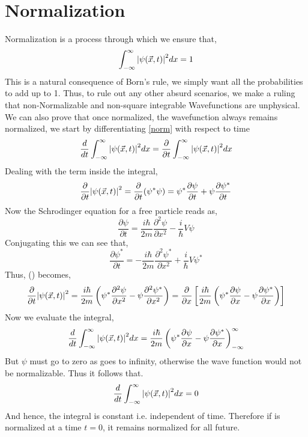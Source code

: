 \section{Normalization}
Normalization is a process through which we ensure that,
\begin{equation}\label{norm}
\int_{- \infty}^{\infty} \abs{\psi(\vec{x}, t)}^{2} dx = 1
\end{equation}
This is a natural consequence of Born's rule, we simply want all the probabilities to add up to 1. Thus, to rule out any other absurd scenarios, we make a ruling that non-Normalizable and non-square integrable Wavefunctions are unphysical.\\
We can also prove that once normalized, the wavefunction always remains normalized, we start by differentiating \ref{norm} with respect to time\\
$$\frac{d}{dt} \int_{- \infty}^{\infty} \abs{\psi(\vec{x}, t)}^{2} dx = \frac{\partial}{\partial t}\int_{- \infty}^{\infty} \abs{\psi(\vec{x}, t)}^{2} dx$$
Dealing with the term inside the integral,
$$ \frac{\partial}{\partial t}\abs{\psi(\vec{x}, t)}^{2} = \frac{\partial}{\partial t} (\psi^{*} \psi ) = \psi^{*}\frac{\partial \psi}{\partial t} + \psi\frac{\partial \psi^{*}}{\partial t}$$
Now the Schrodinger equation for a free particle reads as,
$$\frac{\partial \psi}{\partial t} = \frac{i \hbar}{2m}\frac{\partial^{2} \psi}{\partial x^{2}} - \frac{i}{\hbar}V \psi$$
Conjugating this we can see that,
$$\frac{\partial \psi^{*}}{\partial t} = -\frac{i \hbar}{2m}\frac{\partial^{2} \psi^{*}}{\partial x^{2}} + \frac{i}{\hbar}V \psi^{*}$$
Thus, () becomes,
$$\frac{\partial}{\partial t}\abs{\psi(\vec{x}, t)}^{2} = \frac{i \hbar}{2m}\left( \psi^{*} \frac{\partial^{2} \psi}{\partial x^{2}} - \psi \frac{\partial^{2} \psi^{*}}{\partial x^{2}} \right) = \frac{\partial }{\partial x}\left[\frac{i \hbar}{2m}\left( \psi^{*} \frac{\partial \psi}{\partial x} - \psi \frac{\partial \psi^{*}}{\partial x} \right)\right]$$
Now we evaluate the integral,
$$\frac{d}{dt} \int_{- \infty}^{\infty} \abs{\psi(\vec{x}, t)}^{2} dx = \frac{i \hbar}{2m}\left( \psi^{*} \frac{\partial \psi}{\partial x} - \psi \frac{\partial \psi^{*}}{\partial x} \right)^{\infty}_{- \infty} $$
But $\psi$ must go to zero as goes to infinity, otherwise the wave function would not be normalizable. Thus it follows that.
\begin{equation}
	\frac{d}{dt} \int_{- \infty}^{\infty} \abs{\psi(\vec{x}, t)}^{2} dx = 0
\end{equation}
And hence, the integral is constant i.e. independent of time. Therefore if is normalized at a time $t = 0$, it remains normalized for all future. 
